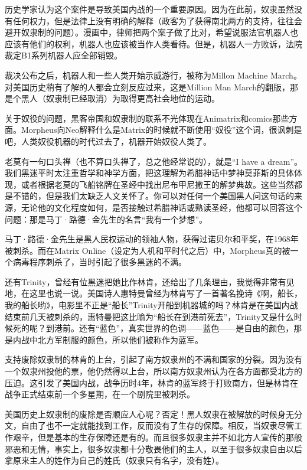 \documentclass[UTF8]{ctexart}
\begin{document}
历史学家认为这个案件是导致美国内战的一个重要原因。因为在此前，奴隶虽然没有任何权力，但是法律上没有明确的解释（政客为了获得南北两方的支持，往往会避开奴隶制的问题）。漫画中，律师把两个案子做了比对，希望说服法官机器人也应该有他们的权利，机器人也应该被当作人类看待。但是，机器人一方败诉，法院裁定B1系列机器人应全部销毁。

裁决公布之后，机器人和一些人类开始示威游行，被称为Millon Machine March。对美国历史稍有了解的人都会立刻反应过来，这是Million Man March的翻版，那是个黑人（奴隶制已经取消）为取得更高社会地位的运动。

关于奴役的问题，黑客帝国和奴隶制的联系不光体现在Animatrix和comics那些方面。Morpheus向Neo解释什么是Matrix的时候就不断使用“奴役”这个词，很讽刺是吧，人类奴役机器的时代过去了，机器开始奴役人类了。

老莫有一句口头禅（也不算口头禅了，总之他经常说的），就是“I have a dream”。我们黑迷平时太注重哲学和神学方面，把这理解为希腊神话中梦神莫菲斯的具体体现，或者根据老莫的飞船铭牌在圣经中找出尼布甲尼撒王的解梦典故。这些当然都是不错的，但是我们太缺乏人文关怀了。你可以对任何一个美国黑人问这句话的来源，无论他的文化程度如何，是否接触过希腊神话或熟读圣经，他都可以回答这个问题：那是马丁·路德·金先生的名言“我有一个梦想”。

马丁·路德·金先生是黑人民权运动的领袖人物，获得过诺贝尔和平奖，在1968年被刺杀。而在Matrix Online（设定为人机和平时代之后）中，Morpheus真的被一个病毒程序刺杀了，当时引起了很多黑迷的不满。

还有Trinity，曾经有位黑迷把她比作林肯，还给出了几条理由，我觉得非常有见地，在这里也说一说。美国诗人惠特曼曾经为林肯写了一首著名挽诗《啊，船长，我的船长哟》，电影里不正是“船长”Trinity开船到机器城的吗？林肯是在美国内战结束前几天被刺杀的，惠特曼把这比喻为“船长在到港前死去”，Trinity又是什么时候死的呢？到港前。还有“蓝色”，真实世界的色调——蓝色——是自由的颜色，那是内战中北方军制服的颜色，所以他们被称作为蓝军。

支持废除奴隶制的林肯的上台，引起了南方奴隶州的不满和国家的分裂。因为没有一个奴隶州投他的票，他仍然得以上台，所以南方奴隶州认为在各方面都受北方的压迫。这引发了美国内战，战争历时4年，林肯的蓝军终于打败南方，但是林肯在战争正式结束前一个多星期，在一个剧院里被刺杀。

美国历史上奴隶制的废除是否顺应人心呢？否定！黑人奴隶在被解放的时候身无分文，自由了也不一定就能找到工作，反而没有了生存的保障。相反，当奴隶尽管工作艰辛，但是基本的生存保障还是有的。而且很多奴隶主并不如北方人宣传的那般邪恶和无情，事实上，很多奴隶都十分敬畏他们的主人，以至于很多奴隶自由以后拿原来主人的姓作为自己的姓氏（奴隶只有名字，没有姓）。
\end{document}
